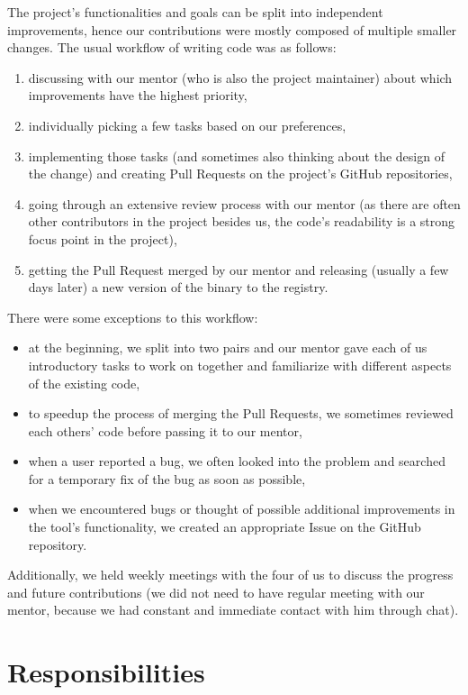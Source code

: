 \documentclass[licencjacka,en]{pracamgr}
\begin{document}
The project's functionalities and goals can be split into independent improvements,
hence our contributions were mostly composed of multiple smaller changes.
The usual workflow of writing code was as follows:
\begin{enumerate}
	\item discussing with our mentor (who is also the project maintainer) about
		which improvements have the highest priority,
	\item individually picking a few tasks based on our preferences,
	\item implementing those tasks
		(and sometimes also thinking about the design of the change)
		and creating Pull Requests
		on the project's GitHub repositories,
	\item going through an extensive review process with our mentor
		(as there are often other contributors in the project besides us,
		the code's readability is a strong focus point in the project),
	\item getting the Pull Request merged by our mentor
		and releasing (usually a few days later) a new version of the binary to the registry.
\end{enumerate}

There were some exceptions to this workflow:
\begin{itemize}
	\item at the beginning, we split into two pairs and our mentor gave each of us
		introductory tasks to work on together and familiarize with different aspects of the existing code,
	\item to speedup the process of merging the Pull Requests,
		we sometimes reviewed each others' code before passing it to our mentor,
	\item when a user reported a bug, we often looked into the problem
		and searched for a temporary fix of the bug as soon as possible,
	\item when we encountered bugs or thought of possible additional improvements
		in the tool's functionality,
		we created an appropriate Issue on the GitHub repository.
\end{itemize}

Additionally, we held weekly meetings with the four of us to discuss the progress and future contributions (we did not need to have regular meeting with our mentor, because we had constant and immediate contact with him through chat).

\section{Responsibilities}
\end{document}
